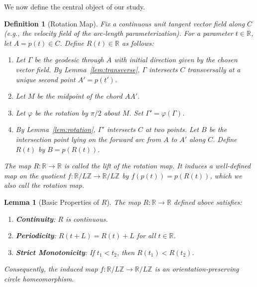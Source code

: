 \documentclass{article}
\newtheorem{lemma}[theorem]{Lemma}
\newtheorem{definition}[theorem]{Definition}
\begin{document}
We now define the central object of our study.

\begin{definition}[Rotation Map]\label{def:rotationmap}
    Fix a continuous unit tangent vector field along $C$ (e.g., the velocity field of the arc-length parameterization). For a parameter $t \in \mathbb{R}$, let $A = p(t) \in C$. Define $R(t) \in \mathbb{R}$ as follows:
    \begin{enumerate}
        \item Let $\Gamma$ be the geodesic through $A$ with initial direction given by the chosen vector field. By Lemma~\ref{lem:transverse}, $\Gamma$ intersects $C$ transversally at a unique second point $A' = p(t')$.
        \item Let $M$ be the midpoint of the chord $AA'$.
        \item Let $\varphi$ be the rotation by $\pi/2$ about $M$. Set $\Gamma' = \varphi(\Gamma)$.
        \item By Lemma~\ref{lem:rotation}, $\Gamma'$ intersects $C$ at two points. Let $B$ be the intersection point lying on the forward arc from $A$ to $A'$ along $C$. Define $R(t)$ by $B = p(R(t))$.
    \end{enumerate}
    The map $R: \mathbb{R} \to \mathbb{R}$ is called the \emph{lift of the rotation map}. It induces a well-defined map on the quotient $f: \mathbb{R}/L\mathbb{Z} \to \mathbb{R}/L\mathbb{Z}$ by $f(p(t)) = p(R(t))$, which we also call the rotation map.
\end{definition}
\begin{lemma}[Basic Properties of $R$]\label{lem:Rprops}
    The map $R: \mathbb{R} \to \mathbb{R}$ defined above satisfies:
    \begin{enumerate}
        \item \textbf{Continuity}: $R$ is continuous.
        \item \textbf{Periodicity}: $R(t + L) = R(t) + L$ for all $t \in \mathbb{R}$.
        \item \textbf{Strict Monotonicity}: If $t_1 < t_2$, then $R(t_1) < R(t_2)$.
    \end{enumerate}
    Consequently, the induced map $f: \mathbb{R}/L\mathbb{Z} \to \mathbb{R}/L\mathbb{Z}$ is an orientation-preserving circle homeomorphism.
\end{lemma}
\end{document}
